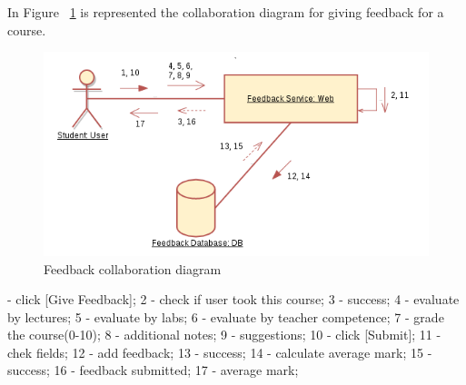 \documentclass[12pt,a4paper,titlepage]{article}
\begin{document}
In Figure ~\ref{fig:4feedback} is represented the collaboration diagram for giving feedback for a course.
\begin{figure}[H]
\centering
\includegraphics[width=15cm]{4feedback}
\caption{Feedback collaboration diagram}
\label{fig:4feedback}
\end{figure}
 - click [Give Feedback];
 2 - check if user took this course;
 3 - success;
 4 - evaluate by lectures;
 5 - evaluate by labs;
 6 - evaluate by teacher competence;
 7 - grade the course(0-10);
 8 - additional notes;
 9 - suggestions;
10 - click [Submit];
11 - chek fields;
12 - add feedback;
13 - success;
14 - calculate average mark;
15 - success;
16 - feedback submitted;
17 - average mark;
\end{document}
